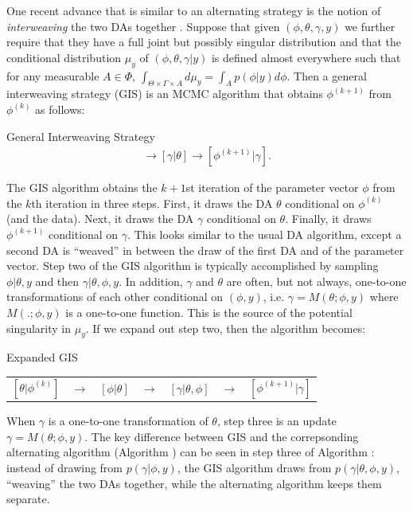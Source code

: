 \documentclass{article}
\begin{document}
One recent advance that is similar to an alternating strategy is the notion of {\it interweaving} the two DAs together \cite{yu2011center}. Suppose that given $(\phi,\theta,\gamma,y)$ we further require that they have a full joint but possibly singular distribution and that the conditional distribution $\mu_y$ of $(\phi,\theta,\gamma|y)$ is defined almost everywhere such that for any measurable $A\in \Phi$, $\int_{\Theta \times \Gamma \times A}d\mu_y = \int_Ap(\phi|y)d\phi$. Then a general interweaving strategy (GIS) is an MCMC algorithm that obtains $\phi^{(k+1)}$ from $\phi^{(k)}$ as follows:
\begin{alg*}[GIS]General Interweaving Strategy\label{alg:GIS}
  \begin{align*}
    [\theta|\phi^{(k)}] \to [\gamma|\theta] \to [\phi^{(k+1)}|\gamma].
  \end{align*}
\end{alg*}
\noindent The GIS algorithm obtains the $k+1$st iteration of the parameter vector $\phi$ from the $k$th iteration in three steps. First, it draws the DA $\theta$ conditional on $\phi^{(k)}$ (and the data). Next, it draws the DA $\gamma$ conditional on $\theta$. Finally, it draws $\phi^{(k+1)}$ conditional on $\gamma$. This looks similar to the usual DA algorithm, except a second DA is ``weaved'' in between the draw of the first DA and of the parameter vector. Step two of the GIS algorithm is typically accomplished by sampling $\phi|\theta,y$ and then $\gamma|\theta,\phi,y$. In addition, $\gamma$ and $\theta$ are often, but not always, one-to-one transformations of each other conditional on $(\phi,y)$, i.e. $\gamma = M(\theta;\phi,y)$ where $M(.;\phi,y)$ is a one-to-one function. This is the source of the potential singularity in $\mu_y$. If we expand out step two, then the algorithm becomes:
\begin{alg*}[GIS-E]Expanded GIS\label{alg:GIS2}\\
  \begin{center}
    \begin{tabular}{lllllll}
      $[\theta|\phi^{(k)}]$& $\to$& $[\phi|\theta]$& $\to $&$[\gamma|\theta,\phi]$& $\to$& $[\phi^{(k+1)}|\gamma]$
    \end{tabular}
  \end{center}
\noindent \end{alg*}
When $\gamma$ is a one-to-one transformation of $\theta$, step three is an update $\gamma=M(\theta;\phi,y)$. The key difference between GIS and the correpsonding alternating algorithm (Algorithm ) can be seen in step three of Algorithm : instead of drawing from $p(\gamma|\phi,y)$, the GIS algorithm draws from $p(\gamma|\theta,\phi,y)$, ``weaving'' the two DAs together, while the alternating algorithm keeps them separate.
\end{document}
